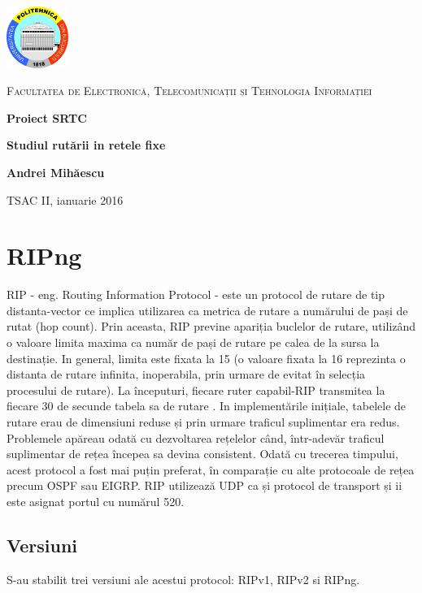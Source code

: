 \documentclass[12pt, a4paper, oneside, romanian]{teza-upb}
\begin{document}
\begin{titlepage}
	\centering
	\includegraphics[width=0.15\textwidth]{img/UPB-logo.png}\par\vspace{1cm}
	{\scshape\LARGE Facultatea de Electronică, Telecomunicații și Tehnologia Informației \par}
	\vspace{1cm}
	{\huge\bfseries Proiect SRTC\par}
	\vspace{2cm}
	{\Large\bfseries Studiul rutării in retele fixe\par}
	\vspace{2cm}
	{\Large\bfseries Andrei Mihăescu\par}
	{\large TSAC II, ianuarie 2016\par}

\end{titlepage}
\newpage

\chapter{RIPng}	
RIP - eng. Routing Information Protocol - este un protocol de rutare de tip distanta-vector ce implica utilizarea ca metrica de rutare a numărului de pași de rutat (hop count). Prin aceasta, RIP previne apariția buclelor de rutare, utilizând o valoare limita maxima ca număr de pași de rutare pe calea de la sursa la destinație. In general, limita este fixata la 15 (o valoare fixata la 16 reprezinta o distanta de rutare infinita, inoperabila, prin urmare de evitat în selecția procesului de rutare). La începuturi, fiecare ruter capabil-RIP transmitea la fiecare 30 de secunde tabela sa de rutare . In implementările inițiale, tabelele de rutare erau de dimensiuni reduse și prin urmare traficul suplimentar era redus. Problemele apăreau odată cu dezvoltarea rețelelor când, într-adevăr traficul suplimentar de rețea începea sa devina consistent. Odată cu trecerea timpului, acest protocol a fost mai puțin preferat, în comparație cu alte protocoale de rețea precum OSPF sau EIGRP. RIP utilizează UDP ca și protocol de transport și ii este asignat portul cu numărul 520.

\section{Versiuni}
S-au stabilit trei versiuni ale acestui protocol: RIPv1, RIPv2 si RIPng.
\end{document}
